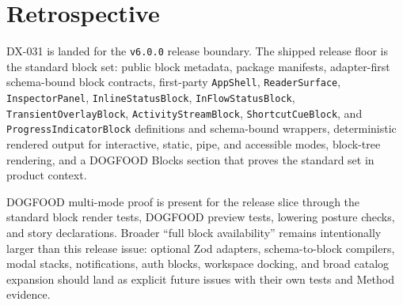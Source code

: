 \section{Retrospective}\label{record-128-retrospective}

DX-031 is landed for the \texttt{v\allowbreak{}6\allowbreak{}.\allowbreak{}0\allowbreak{}.\allowbreak{}0} release boundary. The shipped release floor is the standard block set: public block metadata, package manifests, adapter-first schema-bound block contracts, first-party \texttt{A\allowbreak{}p\allowbreak{}p\allowbreak{}S\allowbreak{}h\allowbreak{}e\allowbreak{}l\allowbreak{}l}, \texttt{R\allowbreak{}e\allowbreak{}a\allowbreak{}d\allowbreak{}e\allowbreak{}r\allowbreak{}S\allowbreak{}u\allowbreak{}r\allowbreak{}f\allowbreak{}a\allowbreak{}c\allowbreak{}e}, \texttt{I\allowbreak{}n\allowbreak{}s\allowbreak{}p\allowbreak{}e\allowbreak{}c\allowbreak{}t\allowbreak{}o\allowbreak{}r\allowbreak{}P\allowbreak{}a\allowbreak{}n\allowbreak{}e\allowbreak{}l}, \texttt{I\allowbreak{}n\allowbreak{}l\allowbreak{}i\allowbreak{}n\allowbreak{}e\allowbreak{}S\allowbreak{}t\allowbreak{}a\allowbreak{}t\allowbreak{}u\allowbreak{}s\allowbreak{}B\allowbreak{}l\allowbreak{}o\allowbreak{}c\allowbreak{}k}, \texttt{I\allowbreak{}n\allowbreak{}F\allowbreak{}l\allowbreak{}o\allowbreak{}w\allowbreak{}S\allowbreak{}t\allowbreak{}a\allowbreak{}t\allowbreak{}u\allowbreak{}s\allowbreak{}B\allowbreak{}l\allowbreak{}o\allowbreak{}c\allowbreak{}k}, \texttt{T\allowbreak{}r\allowbreak{}a\allowbreak{}n\allowbreak{}s\allowbreak{}i\allowbreak{}e\allowbreak{}n\allowbreak{}t\allowbreak{}O\allowbreak{}v\allowbreak{}e\allowbreak{}r\allowbreak{}l\allowbreak{}a\allowbreak{}y\allowbreak{}B\allowbreak{}l\allowbreak{}o\allowbreak{}c\allowbreak{}k}, \texttt{A\allowbreak{}c\allowbreak{}t\allowbreak{}i\allowbreak{}v\allowbreak{}i\allowbreak{}t\allowbreak{}y\allowbreak{}S\allowbreak{}t\allowbreak{}r\allowbreak{}e\allowbreak{}a\allowbreak{}m\allowbreak{}B\allowbreak{}l\allowbreak{}o\allowbreak{}c\allowbreak{}k}, \texttt{S\allowbreak{}h\allowbreak{}o\allowbreak{}r\allowbreak{}t\allowbreak{}c\allowbreak{}u\allowbreak{}t\allowbreak{}C\allowbreak{}u\allowbreak{}e\allowbreak{}B\allowbreak{}l\allowbreak{}o\allowbreak{}c\allowbreak{}k}, and \texttt{P\allowbreak{}r\allowbreak{}o\allowbreak{}g\allowbreak{}r\allowbreak{}e\allowbreak{}s\allowbreak{}s\allowbreak{}I\allowbreak{}n\allowbreak{}d\allowbreak{}i\allowbreak{}c\allowbreak{}a\allowbreak{}t\allowbreak{}o\allowbreak{}r\allowbreak{}B\allowbreak{}l\allowbreak{}o\allowbreak{}c\allowbreak{}k} definitions and schema-bound wrappers, deterministic rendered output for interactive, static, pipe, and accessible modes, block-tree rendering, and a DOGFOOD Blocks section that proves the standard set in product context.

DOGFOOD multi-mode proof is present for the release slice through the standard block render tests, DOGFOOD preview tests, lowering posture checks, and story declarations. Broader ``full block availability'' remains intentionally larger than this release issue: optional Zod adapters, schema-to-block compilers, modal stacks, notifications, auth blocks, workspace docking, and broad catalog expansion should land as explicit future issues with their own tests and Method evidence.

